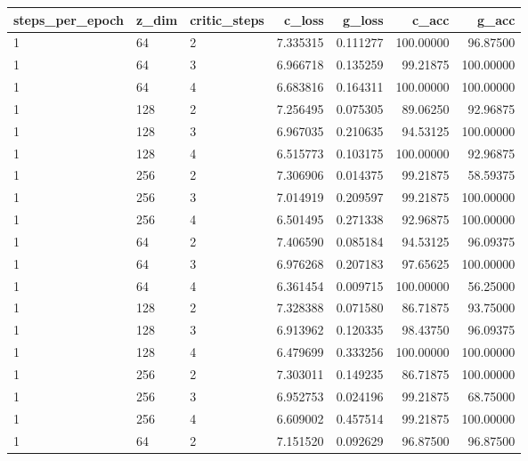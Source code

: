 \begin{tabular}{lllrrrr}
\toprule
steps\_per\_epoch & z\_dim & critic\_steps &   c\_loss &   g\_loss &     c\_acc &     g\_acc \\
\midrule
              1 &    64 &            2 & 7.335315 & 0.111277 & 100.00000 &  96.87500 \\
              1 &    64 &            3 & 6.966718 & 0.135259 &  99.21875 & 100.00000 \\
              1 &    64 &            4 & 6.683816 & 0.164311 & 100.00000 & 100.00000 \\
              1 &   128 &            2 & 7.256495 & 0.075305 &  89.06250 &  92.96875 \\
              1 &   128 &            3 & 6.967035 & 0.210635 &  94.53125 & 100.00000 \\
              1 &   128 &            4 & 6.515773 & 0.103175 & 100.00000 &  92.96875 \\
              1 &   256 &            2 & 7.306906 & 0.014375 &  99.21875 &  58.59375 \\
              1 &   256 &            3 & 7.014919 & 0.209597 &  99.21875 & 100.00000 \\
              1 &   256 &            4 & 6.501495 & 0.271338 &  92.96875 & 100.00000 \\
              1 &    64 &            2 & 7.406590 & 0.085184 &  94.53125 &  96.09375 \\
              1 &    64 &            3 & 6.976268 & 0.207183 &  97.65625 & 100.00000 \\
              1 &    64 &            4 & 6.361454 & 0.009715 & 100.00000 &  56.25000 \\
              1 &   128 &            2 & 7.328388 & 0.071580 &  86.71875 &  93.75000 \\
              1 &   128 &            3 & 6.913962 & 0.120335 &  98.43750 &  96.09375 \\
              1 &   128 &            4 & 6.479699 & 0.333256 & 100.00000 & 100.00000 \\
              1 &   256 &            2 & 7.303011 & 0.149235 &  86.71875 & 100.00000 \\
              1 &   256 &            3 & 6.952753 & 0.024196 &  99.21875 &  68.75000 \\
              1 &   256 &            4 & 6.609002 & 0.457514 &  99.21875 & 100.00000 \\
              1 &    64 &            2 & 7.151520 & 0.092629 &  96.87500 &  96.87500 \\

\end{tabular}
